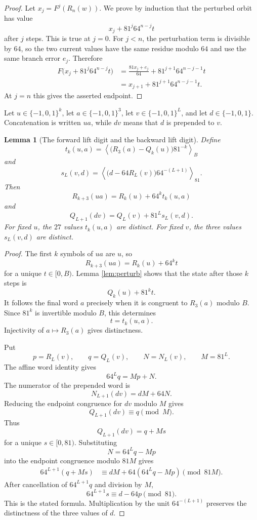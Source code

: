 \documentclass[11pt]{article}
\newtheorem{lemma}[theorem]{Lemma}
\theoremstyle{remark}
\newcommand{\E}{\{-1,0,1\}}
\newcommand{\res}[2]{\left\langle #1\right\rangle_{#2}}
\begin{document}
\begin{proof}
Let $x_j=F^j(R_n(w))$.  We prove by induction that the perturbed orbit has value
\[
x_j+81^j64^{n-j}t
\]
after $j$ steps.  This is true at $j=0$.  For $j<n$, the perturbation term is divisible by $64$, so the two current values have the same residue modulo $64$ and use the same branch error $e_j$.  Therefore
\begin{align*}
F\bigl(x_j+81^j64^{n-j}t\bigr)
&=\frac{81x_j+e_j}{64}+81^{j+1}64^{n-j-1}t\\
&=x_{j+1}+81^{j+1}64^{n-j-1}t.
\end{align*}
At $j=n$ this gives the asserted endpoint.
\end{proof}

Let $u\in\E^k$, let $a\in\E^3$, let $v\in\E^L$, and let $d\in\E$.  Concatenation is written $ua$, while $dv$ means that $d$ is prepended to $v$.

\begin{lemma}[The forward lift digit and the backward lift digit]
\label{lem:lifts}
Define
\[
t_k(u,a)=
\res{\bigl(R_3(a)-Q_k(u)\bigr)81^{-k}}{B}
\]
and
\[
s_L(v,d)=
\res{\bigl(d-64R_L(v)\bigr)64^{-(L+1)}}{81}.
\]
Then
\[
R_{k+3}(ua)=R_k(u)+64^k t_k(u,a)
\]
and
\[
Q_{L+1}(dv)=Q_L(v)+81^L s_L(v,d).
\]
For fixed $u$, the $27$ values $t_k(u,a)$ are distinct.  For fixed $v$, the three values $s_L(v,d)$ are distinct.
\end{lemma}

\begin{proof}
The first $k$ symbols of $ua$ are $u$, so
\[
R_{k+3}(ua)=R_k(u)+64^kt
\]
for a unique $t\in[0,B)$.  Lemma \ref{lem:perturb} shows that the state after those $k$ steps is
\[
Q_k(u)+81^kt.
\]
It follows the final word $a$ precisely when it is congruent to $R_3(a)$ modulo $B$.  Since $81^k$ is invertible modulo $B$, this determines
\[
t=t_k(u,a).
\]
Injectivity of $a\mapsto R_3(a)$ gives distinctness.

Put
\[
p=R_L(v),
\qquad
q=Q_L(v),
\qquad
N=N_L(v),
\qquad
M=81^L.
\]
The affine word identity gives
\[
64^Lq=M p+N.
\]
The numerator of the prepended word is
\[
N_{L+1}(dv)=dM+64N.
\]
Reducing the endpoint congruence for $dv$ modulo $M$ gives
\[
Q_{L+1}(dv)\equiv q\pmod M.
\]
Thus
\[
Q_{L+1}(dv)=q+Ms
\]
for a unique $s\in[0,81)$.  Substituting
\[
N=64^Lq-Mp
\]
into the endpoint congruence modulo $81M$ gives
\begin{align*}
64^{L+1}(q+Ms)
&\equiv dM+64(64^Lq-Mp)\pmod{81M}.
\end{align*}
After cancellation of $64^{L+1}q$ and division by $M$,
\[
64^{L+1}s\equiv d-64p\pmod{81}.
\]
This is the stated formula.  Multiplication by the unit $64^{-(L+1)}$ preserves the distinctness of the three values of $d$.
\end{proof}
\end{document}
